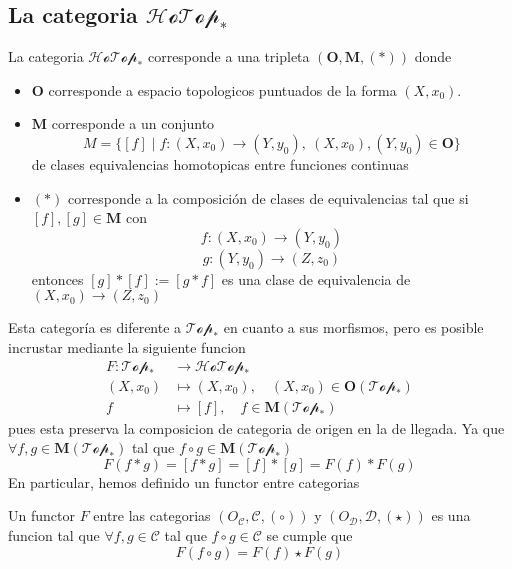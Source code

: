 \subsection{La categoria \(\mathscr{HoTop}_*\)}
\begin{definicion}
  La categoria \(\mathscr{HoTop}_*\) corresponde a una tripleta
  \((\mathbf{O},\mathbf M, (*))\) donde
  \begin{itemize}
  \item \(\mathbf O\) corresponde a espacio topologicos puntuados de la
    forma \((X, x_0)\).
  \item \(\mathbf M\) corresponde a un conjunto
    \[ M = \{ [f] \mid f : (X,x_0) \to (Y,y_0),\ (X,x_0),(Y,y_0) \in
      \mathbf O \}\]
    de clases equivalencias homotopicas entre funciones continuas
  \item \((*)\) corresponde a la composición de clases de
    equivalencias tal que si \([f] , [g] \in \mathbf M \) con
    \[ f : (X,x_0) \to (Y, y_0)\]
    \[ g : (Y, y_0) \to (Z, z_0)\]
    entonces \([g] * [f] := [ g * f ] \) es una clase de equivalencia de
    \((X, x_0) \to (Z, z_0)\)
  \end{itemize}
\end{definicion}
Esta categoría es diferente a \(\mathscr{Top}_*\) en cuanto a sus
morfismos, pero es posible incrustar mediante la siguiente funcion
\begin{align*}
  F : \mathscr{Top}_* &\longrightarrow \mathscr{HoTop}_* \\
      \left( X , x_0 \right) &\longmapsto \left( X , x_0 \right), \quad \left( X, x_0 \right) \in \mathbf O \left( \mathscr{Top}_* \right) \\
      f &\longmapsto [f], \quad f \in \mathbf M \left( \mathscr{Top}_* \right)
\end{align*}
pues esta preserva la composicion de categoria de origen en la de
llegada. Ya que \(\forall f,g \in \mathbf M (\mathscr{Top}_*)\) tal que
\(f \circ g \in \mathbf M (\mathscr{Top}_*)\)
\[ F(f * g) = [f * g] = [f] * [g] = F(f) * F(g) \]
En particular, hemos definido un functor entre categorias
\begin{definicion}[Functor]
  Un functor \(F\) entre las categorias \( \left( O_{\mathcal C} ,
    \mathcal C , (\circ) \right) \) y \(\left( O_{\mathcal D} , \mathcal
      D , (\star) \right)\)
  es una funcion tal que \(\forall f,g \in \mathcal C \) tal que \( f
  \circ g \in \mathcal C\) se cumple que
  \[ F(f \circ g) = F(f) \star F(g) \]
\end{definicion}


